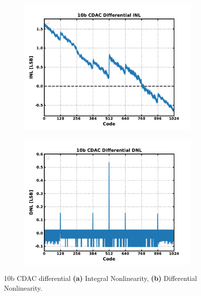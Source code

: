	\begin{figure}[htb!]
	    \centering
	    \begin{subfigure}{0.5\textwidth}
	        \centering
	        \includegraphics[width=1\textwidth, angle=0]{./figs/results/10b_cdac_diff_inl}
	        \caption{ }
	        \label{fig:10b_cdac_diff_inl}
	    \end{subfigure}%
	    \begin{subfigure}{0.5\textwidth}
	        \centering
	        \includegraphics[width=1\textwidth, angle=0]{./figs/results/10b_cdac_diff_dnl}
	        \caption{ }
	        \label{fig:10b_cdac_diff_dnl}
	    \end{subfigure}
	    \label{fig:10b_cdac_diff_nonlinearity}
	    \caption{10b CDAC differential \textbf{(a)} Integral Nonlinearity, \textbf{(b)} Differential Nonlinearity.}
	\end{figure} 



